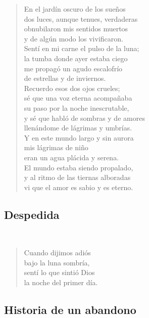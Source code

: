 \documentclass[a4paper, 12pt]{article}
\begin{document}
\begin{verse}
En el jardín oscuro de los sueños\\
dos luces, aunque tenues, verdaderas\\
obnubilaron mis sentidos muertos\\
y de algún modo los vivificaron.\\
Sentí en mi carne el pulso de la luna;\\
la tumba donde ayer estaba ciego\\
me propagó un agudo escalofrío\\
de estrellas y de inviernos.\\
Recuerdo esos dos ojos crueles;\\
sé que una voz eterna acompañaba\\
su paso por la noche inescrutable,\\
y sé que habló de sombras y de amores\\
llenándome de lágrimas y umbrías.\\
Y en este mundo largo y sin aurora\\
mis lágrimas de niño\\
eran un agua plácida y serena.\\
El mundo estaba siendo propalado,\\
y al ritmo de las tiernas alboradas\\
vi que el amor es sabio y es eterno.\\
\end{verse}

\pagebreak

\subsection{Despedida}
~ 

\begin{verse}
    
Cuando dijimos adiós\\
bajo la luna sombría,\\
sentí lo que sintió Dios\\
la noche del primer día.\\
\end{verse}

\pagebreak

\subsection{Historia de un abandono}
~ 
\end{document}
